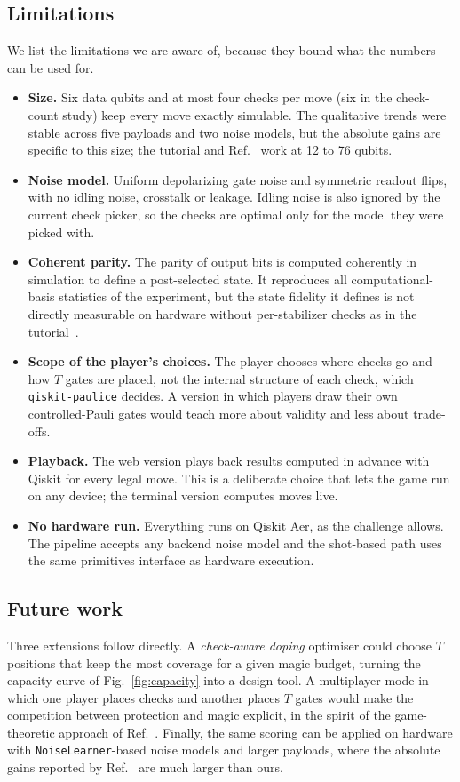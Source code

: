 \subsection{Limitations}
We list the limitations we are aware of, because they bound what the numbers can be used for.
\begin{itemize}[leftmargin=*,itemsep=2pt]
  \item \textbf{Size.} Six data qubits and at most four checks per move (six in the check-count study) keep every move exactly simulable. The qualitative trends were stable across five payloads and two noise models, but the absolute gains are specific to this size; the tutorial and Ref.~\cite{martiel2026sampling} work at 12 to 76 qubits.
  \item \textbf{Noise model.} Uniform depolarizing gate noise and symmetric readout flips, with no idling noise, crosstalk or leakage. Idling noise is also ignored by the current check picker, so the checks are optimal only for the model they were picked with.
  \item \textbf{Coherent parity.} The parity of output bits is computed coherently in simulation to define a post-selected state. It reproduces all computational-basis statistics of the experiment, but the state fidelity it defines is not directly measurable on hardware without per-stabilizer checks as in the tutorial~\cite{ibm_tutorial_spacetime}.
  \item \textbf{Scope of the player's choices.} The player chooses where checks go and how $T$ gates are placed, not the internal structure of each check, which \texttt{qiskit-paulice} decides. A version in which players draw their own controlled-Pauli gates would teach more about validity and less about trade-offs.
  \item \textbf{Playback.} The web version plays back results computed in advance with Qiskit for every legal move. This is a deliberate choice that lets the game run on any device; the terminal version computes moves live.
  \item \textbf{No hardware run.} Everything runs on Qiskit Aer, as the challenge allows. The pipeline accepts any backend noise model and the shot-based path uses the same primitives interface as hardware execution.
\end{itemize}

\subsection{Future work}
Three extensions follow directly. A \emph{check-aware doping} optimiser could choose $T$ positions that keep the most coverage for a given magic budget, turning the capacity curve of Fig.~\ref{fig:capacity} into a design tool. A multiplayer mode in which one player places checks and another places $T$ gates would make the competition between protection and magic explicit, in the spirit of the game-theoretic approach of Ref.~\cite{guerrero2025nash}. Finally, the same scoring can be applied on hardware with \texttt{NoiseLearner}-based noise models and larger payloads, where the absolute gains reported by Ref.~\cite{martiel2025spacetime} are much larger than ours.

